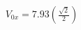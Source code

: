 \documentclass[preview]{standalone}
\begin{document}
\begin{align*}
V_{0x} = 7.93\left(\tfrac{\sqrt{2}}{2}\right)
\end{align*}
\end{document}

